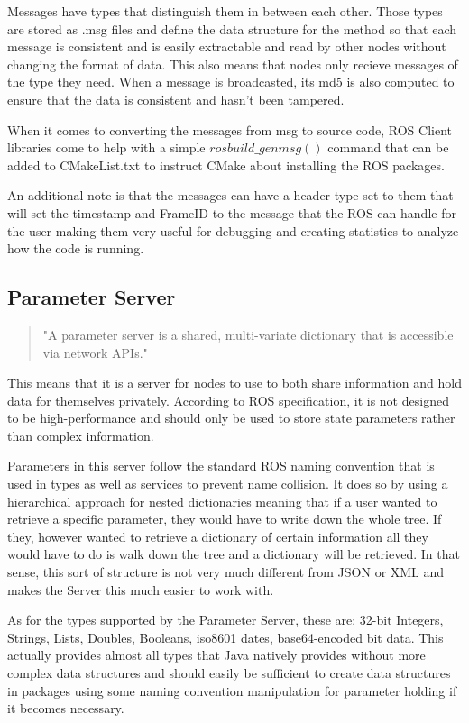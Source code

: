 \documentclass{report}
\begin{document}
      Messages have types that distinguish them in between each other. Those types are stored as .msg files and define the data structure for the method so that each message is consistent and is easily extractable and read by other nodes without changing the format of data. This also means that nodes only recieve messages of the type they need. When a message is broadcasted, its md5 is also computed to ensure that the data is consistent and hasn't been tampered.

      When it comes to converting the messages from msg to source code, ROS Client libraries come to help with a simple $rosbuild\_genmsg()$ command that can be added to CMakeList.txt to instruct CMake about installing the ROS packages.

      An additional note is that the messages can have a header type set to them that will set the timestamp and FrameID to the message that the ROS can handle for the user making them very useful for debugging and creating statistics to analyze how the code is running.

      \subsection{Parameter Server}

      \begin{quote}"A parameter server is a shared, multi-variate dictionary that is accessible via network APIs."\end{quote} 
      This means that it is a server for nodes to use to both share information and hold data for themselves privately. According to ROS specification, it is not designed to be high-performance and should only be used to store state parameters rather than complex information.

      Parameters in this server follow the standard ROS naming convention that is used in types as well as services to prevent name collision. It does so by using a hierarchical approach for nested dictionaries meaning that if a user wanted to retrieve a specific parameter, they would have to write down the whole tree. If they, however wanted to retrieve a dictionary of certain information all they would have to do is walk down the tree and a dictionary will be retrieved. In that sense, this sort of structure is not very much different from JSON or XML and makes the Server this much easier to work with.

      As for the types supported by the Parameter Server, these are: 32-bit Integers, Strings, Lists, Doubles, Booleans, iso8601 dates, base64-encoded bit data. This actually provides almost all types that Java natively provides without more complex data structures and should easily be sufficient to create data structures in packages using some naming convention manipulation for parameter holding if it becomes necessary.
\end{document}
